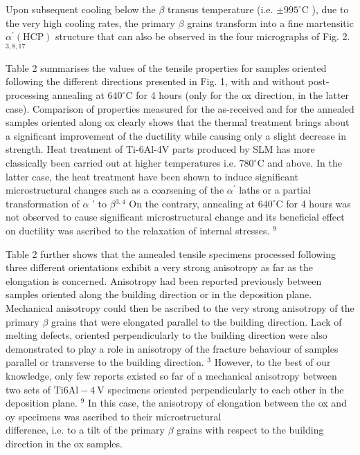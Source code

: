 \documentclass[10pt]{article}
\begin{document}
Upon subsequent cooling below the $\beta$ transus temperature (i.e. $\pm 995^{\circ} \mathrm{C}$ ), due to the very high cooling rates, the primary $\beta$ grains transform into a fine martensitic $\alpha^{\prime}(\mathrm{HCP})$ structure that can also be observed in the four micrographs of Fig. 2. ${ }^{3,8,17}$

Table 2 summarises the values of the tensile properties for samples oriented following the different directions presented in Fig. 1, with and without post-processing annealing at $640^{\circ} \mathrm{C}$ for 4 hours (only for the ox direction, in the latter case). Comparison of properties measured for the as-received and for the annealed samples oriented along ox clearly shows that the thermal treatment brings about a significant improvement of the ductility while causing only a slight decrease in strength. Heat treatment of Ti-6Al-4V parts produced by SLM has more classically been carried out at higher temperatures i.e. $780^{\circ} \mathrm{C}$ and above. In the latter case, the heat treatment have been shown to induce significant microstructural changes such as a coarsening of the $\alpha^{\prime}$ laths or a partial transformation of $\alpha$ ' to $\beta{ }^{3,4}$ On the contrary, annealing at $640^{\circ} \mathrm{C}$ for 4 hours was not observed to cause significant microstructural change and its beneficial effect on ductility was ascribed to the relaxation of internal stresses. ${ }^{9}$

Table 2 further shows that the annealed tensile specimens processed following three different orientations exhibit a very strong anisotropy as far as the elongation is concerned. Anisotropy had been reported previously between samples oriented along the building direction or in the deposition plane. Mechanical anisotropy could then be ascribed to the very strong anisotropy of the primary $\beta$ grains that were elongated parallel to the building direction. Lack of melting defects, oriented perpendicularly to the building direction were also demonstrated to play a role in anisotropy of the fracture behaviour of samples parallel or transverse to the building direction. ${ }^{3}$ However, to the best of our knowledge, only few reports existed so far of a mechanical anisotropy between two sets of Ti$6 \mathrm{Al}-4 \mathrm{~V}$ specimens oriented perpendicularly to each other in the deposition plane. ${ }^{9}$ In this case, the anisotropy of elongation between the ox and oy specimens was ascribed to their microstructural\\
difference, i.e. to a tilt of the primary $\beta$ grains with respect to the building direction in the ox samples.
\end{document}
